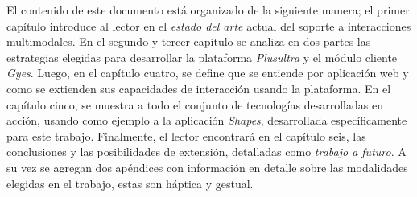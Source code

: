 El contenido de este documento está organizado de la siguiente manera; el primer capítulo introduce al lector en el \emph{estado del arte} actual del soporte a interacciones multimodales. En el segundo y tercer capítulo se analiza en dos partes las estrategias elegidas para desarrollar la plataforma \emph{Plusultra} y el módulo cliente \emph{Gyes}. Luego, en el capítulo cuatro, se define que se entiende por aplicación web y como se extienden sus capacidades de interacción usando la plataforma. En el capítulo cinco, se muestra a todo el conjunto de tecnologías desarrolladas en acción, usando como ejemplo a la aplicación \emph{Shapes}, desarrollada específicamente para este trabajo. Finalmente, el lector encontrará en el capítulo seis, las conclusiones y las posibilidades de extensión, detalladas como \emph{trabajo a futuro}. A su vez se agregan dos apéndices con información en detalle sobre las modalidades elegidas en el trabajo, estas son háptica y gestual.

\endgroup			

\vfill